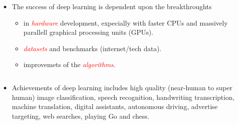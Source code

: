 \documentclass[10pt,ignorenonframetext,]{beamer}
\providecommand{\tightlist}{%
  \setlength{\itemsep}{0pt}\setlength{\parskip}{0pt}}
\begin{document}
\begin{frame}

\begin{itemize}
\tightlist
\item
  The success of deep learning is dependent upon the breakthroughts

  \begin{itemize}
  \tightlist
  \item
    in \emph{\textcolor{red}{hardware}} development, expecially with
    faster CPUs and massively parallell graphical processing units
    (GPUs).
  \item
    \emph{\textcolor{red}{datasets}} and benchmarks (internet/tech
    data).
  \item
    improvemets of the \emph{\textcolor{red}{algorithms}}.
  \end{itemize}
\end{itemize}

\(~\)

\begin{itemize}
\tightlist
\item
  Achievements of deep learning includes high quality (near-human to
  super human) image classification, speech recognition, handwriting
  transcription, machine translation, digital assistants, autonomous
  driving, advertise targeting, web searches, playing Go and chess.
\end{itemize}

\end{frame}
\end{document}

